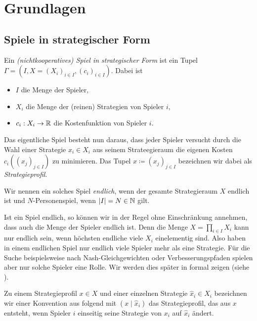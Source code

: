 \section{Grundlagen}\label{sec:Grundlagen}

\subsection{Spiele in strategischer Form}

\begin{defn}
	Ein \emph{(nichtkooperatives) Spiel in strategischer Form} ist ein Tupel $\Gamma = (I, X = (X_i)_{i \in I}, (c_i)_{i\in I})$. Dabei ist
	\begin{itemize}
		\item $I$ die Menge der Spieler,
		\item $X_i$ die Menge der (reinen) Strategien von Spieler $i$,
		\item $c_i: X_i \to \mathbb{R}$ die Kostenfunktion von Spieler $i$.
	\end{itemize}
	Das eigentliche Spiel besteht nun daraus, dass jeder Spieler versucht durch die Wahl einer Strategie $x_i \in X_i$ aus seinem Strateegieraum die eigenen Kosten $c_i((x_j)_{j \in I})$ zu minimieren. Das Tupel $x \coloneqq (x_j)_{j \in I}$ bezeichnen wir dabei als \emph{Strategieprofil}.
	
	Wir nennen ein solches Spiel \emph{endlich}, wenn der gesamte Strategieraum $X$ endlich ist und $N$-Personenspiel, wenn $\left|I\right| = N \in \mathbb{N}$ gilt.
\end{defn}

\begin{beob}\label{beob:endlicheSpiele}
	Ist ein Spiel endlich, so können wir in der Regel ohne Einschränkung annehmen, dass auch die Menge der Spieler endlich ist. Denn die Menge $X = \prod_{i\in I} X_i$ kann nur endlich sein, wenn höchsten endliche viele $X_i$ einelementig sind. Also haben in einem endlichen Spiel nur endlich viele Spieler mehr als eine Strategie. Für die Suche beispielsweise nach Nash-Gleichgewichten oder Verbesserungspfaden spielen aber nur solche Spieler eine Rolle. Wir werden dies später in  formal zeigen (siehe ).
\end{beob}

\begin{notation}
	Zu einem Strategieprofil $x \in X$ und einer einzelnen Strategie $\hat{x}_i \in X_i$ bezeichnen wir einer Konvention aus \cite{Polyequilibrium} folgend mit $(x \mid \hat{x}_i)$ das Strategieprofil, das aus $x$ entsteht, wenn Spieler $i$ einseitig seine Strategie von $x_i$ auf $\hat{x}_i$ ändert.
\end{notation}

